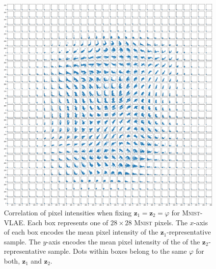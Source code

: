 \begin{figure}
    \centering
    \includegraphics[width=\textwidth]{images/notprop/mnist/vlae/ccs_0_1_vlae.png}
    \caption[\textsc{Mnist}-\ac{VLAE} - Pixel intensity correlation]{Correlation of pixel intensities when fixing $\bm{z}_1 = \bm{z}_2=\varphi$ for \textsc{Mnist}-\ac{VLAE}. Each box represents one of $28\times 28$ \textsc{Mnist} pixels. The $x$-axis of each box encodes the mean pixel intensity of the $\bm{z}_1$-representative sample. The $y$-axis encodes the mean pixel intensity of the of the $\bm{z}_2$-representative sample. Dots within boxes belong to the same $\varphi$ for both, $\bm{z}_1$ and $\bm{z}_2$. }
    \label{fig:notprop}
\end{figure}

